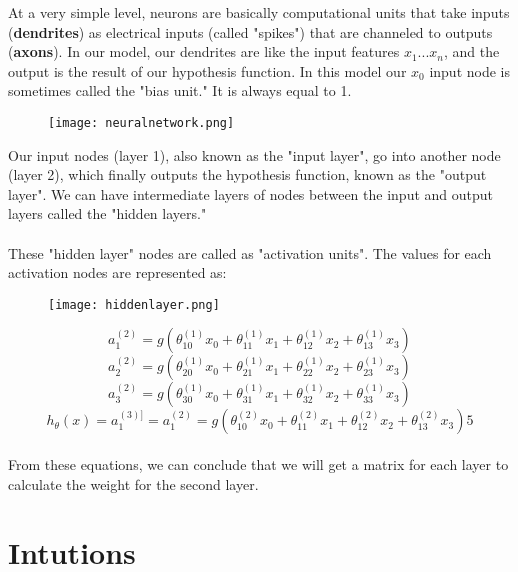   At a very simple level, neurons are basically computational units that take inputs (\textbf{dendrites}) as electrical inputs (called "spikes") that are channeled to outputs (\textbf{axons}). In our model, our dendrites are like the input features $x_1...x_n$, and the output is the result of our hypothesis function. In this model our $x_0$ input node is sometimes called the "bias unit." It is always equal to 1.

  \begin{figure}[h]
    \centering
    \texttt{[image: neuralnetwork.png]}
  \end{figure}

  Our input nodes (layer 1), also known as the "input layer", go into another node (layer 2), which finally outputs the hypothesis function, known as the "output layer". We can have intermediate layers of nodes between the input and output layers called the "hidden layers."
  \\\\
  These "hidden layer" nodes are called as "activation units". The values for each activation nodes are represented as: \\
  \begin{figure}[h]
    \centering
    \texttt{[image: hiddenlayer.png]}
  \end{figure}

  \begin{equation}
    a_1^{(2)} = g(\theta_{10}^{(1)}x_0 + \theta_{11}^{(1)}x_1 + \theta_{12}^{(1)}x_2 + \theta_{13}^{(1)}x_3)
  \end{equation}
  \begin{equation}
    a_2^{(2)} = g(\theta_{20}^{(1)}x_0 + \theta_{21}^{(1)}x_1 + \theta_{22}^{(1)}x_2 + \theta_{23}^{(1)}x_3)
  \end{equation}
  \begin{equation}
    a_3^{(2)} = g(\theta_{30}^{(1)}x_0 + \theta_{31}^{(1)}x_1 + \theta_{32}^{(1)}x_2 + \theta_{33}^{(1)}x_3)
  \end{equation}
  \begin{equation}
    h_\theta(x) = a_1^{(3)]} = a_1^{(2)} = g(\theta_{10}^{(2)}x_0 + \theta_{11}^{(2)}x_1 + \theta_{12}^{(2)}x_2 + \theta_{13}^{(2)}x_3)5
  \end{equation}
  \\From these equations, we can conclude that we will get a matrix for each layer to calculate the weight for the second layer.

  \section{Intutions}
